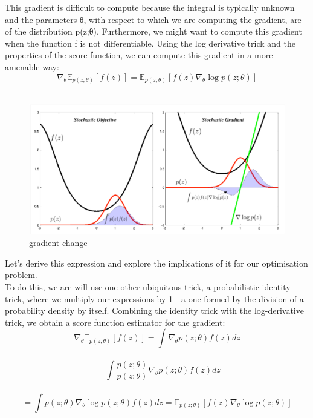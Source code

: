 \documentclass[14pt,a4paper]{report}  %
\begin{document}
\qquad This gradient is difficult to compute because the integral is typically unknown and the parameters θ, with respect to which we are computing the gradient, are of the distribution p(z;θ). Furthermore, we might want to compute this gradient when the function f is not differentiable. Using the log derivative trick and the properties of the score function, we can compute this gradient in a more amenable way:\\
$$\nabla_\theta \mathbb{E}_{p(z;\theta)}[f(z)] = \mathbb{E}_{p(z;\theta)}[f(z)\nabla_\theta \log p(z;\theta)]$$\\
\begin{figure}[hbt!]
\begin{center}
\includegraphics[scale=0.5]{gradient_change}
\caption{gradient change}%
\end{center}
\end{figure}
\qquad Let's derive this expression and explore the implications of it for our optimisation problem.\\
\qquad To do this, we are will use one other ubiquitous trick, a probabilistic identity trick, where we multiply our expressions by 1—a one formed by the division of a probability density by itself.  Combining the identity trick with the log-derivative trick, we obtain a score function estimator for the gradient:\\
$$\nabla_\theta \mathbb{E}_{p(z;\theta)}[f(z)]=\int\nabla_\theta p(z;\theta)f(z) dz$$\\[6pt]
$$= \int \frac{p(z;\theta)}{p(z;\theta)}\nabla_\theta p(z;\theta)f(z) dz$$\\[6pt]
$$=\int p(z;\theta)\nabla_\theta \log p(z;\theta)f(z) dz = \mathbb{E}_{p(z;\theta)}[f(z)\nabla_\theta \log p(z;\theta)]$$\\[6pt]
\end{document}
